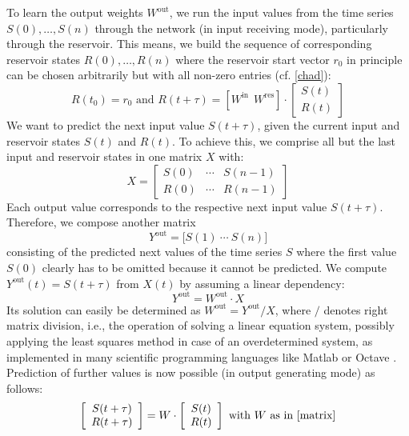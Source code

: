 \documentclass[twoside,11pt]{article}
\theoremstyle{definition}
\begin{document}
To learn the output weights $W^\mathrm{out}$, we run the input values from the
time series $S(0),\dots,S(n)$ through the network (in input receiving mode),
particularly through the reservoir. This means, we build the sequence of
corresponding reservoir states $R(0),\dots,R(n)$ where the reservoir start
vector $r_0$ in principle can be chosen arbitrarily but with all non-zero
entries (cf. \cref{chad}):
\begin{equation}\label{Res}
	R(t_0) = r_0 \text{~and~} R(t+\tau) =
	\left[ W^\mathrm{in} ~~ W^\mathrm{res} \right] \cdot
	\left[ \begin{array}{c} S(t) \\ R(t) \end{array} \right]
\end{equation}
We want to predict the next input value $S(t+\tau)$, given the current input and
reservoir states $S(t)$ and $R(t)$. To achieve this, we comprise
all but the last input and reservoir states in one matrix $X$ with:
\begin{equation}\label{Xin}
    X = \left[ \begin{array}{ccc}
	S(0) & \cdots & S(n-1)\\
	R(0) & \cdots & R(n-1)
	\end{array} \right]
\end{equation}
Each output value corresponds to the respective next input value $S(t+\tau)$.
Therefore, we compose another matrix
\begin{equation}\label{Yout}
	Y^\mathrm{out} = \big[ S(1)\ \cdots\ S(n) \big]
\end{equation}
consisting of the predicted next values of the time series $S$
where the first value $S(0)$ clearly has to be omitted because it cannot be
predicted. We compute $Y^\mathrm{out}(t) = S(t+\tau)$ from $X(t)$ by assuming a
linear dependency:
\begin{equation}\label{linear}
	Y^\mathrm{out} = W^\mathrm{out} \cdot X
\end{equation}
Its solution can easily be determined as $W^\mathrm{out} = Y^\mathrm{out}/X$,
where $/$ denotes right matrix division, i.e., the operation of solving a linear
equation system, possibly applying the least squares method in case of an
overdetermined system, as implemented in many scientific programming languages
like Matlab \citep{HH17} or Octave \citep{EB+17}. Prediction of further values
is now possible (in output generating mode) as follows:
\begin{equation}\label{predict}
	\left[ \begin{array}{c} S(t+\tau) \\ R(t+\tau) \end{array} \right]
	= W \cdot \left[ \begin{array}{c} S(t) \\ R(t) \end{array} \right]
	\text{~with~} W \text{~as in \cref{matrix}}
\end{equation}
\end{document}

